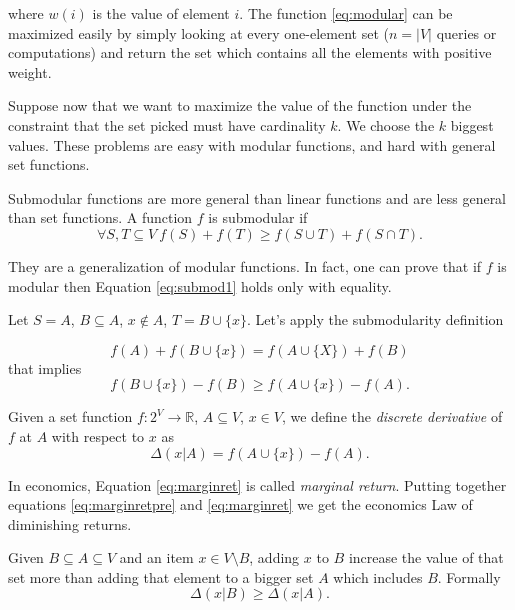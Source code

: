 where $w(i)$ is the value of element $i$. The function \ref{eq:modular} can be maximized easily by simply looking at every one-element set ($n = |V|$ queries or computations) and return the set which contains all the elements with positive weight.

Suppose now that we want to maximize the value of the function under the constraint that the set picked must have cardinality $k$. We choose the $k$ biggest values. These problems are easy with modular functions, and hard with general set functions.

\begin{defn}\label{def:submod1}
	Submodular functions are more general than linear functions and are less general than set functions. A function $f$ is submodular if
	\begin{equation}\label{eq:submod1}
	\forall S, T \subseteq V\ f(S) + f(T) \geq f(S \cup T) + f(S \cap T).
	\end{equation}
\end{defn}

They are a generalization of modular functions. In fact, one can prove that if $f$ is modular then Equation \ref{eq:submod1} holds only with equality.


Let $S = A$, $B \subseteq A$, $x \not\in A$, $T = B \cup \{x\}$. Let's apply the submodularity definition

\begin{equation}
f(A) + f(B \cup \{x\}) = f(A \cup \{X\}) + f(B)
\end{equation}
that implies
\begin{equation}\label{eq:marginretpre}
f(B \cup \{x\}) - f(B) \geq f(A \cup\{x\}) - f(A).
\end{equation}

\begin{defn}
	Given a set function $f:2^V \rightarrow \mathbb{R}$, $A \subseteq V$, $x \in V$, we define the \emph{discrete derivative} of $f$ at $A$ with respect to $x$ as
	\begin{equation}\label{eq:marginret}
	\Delta(x|A) = f(A\cup\{x\}) - f(A).
	\end{equation}
\end{defn}

In economics, Equation \ref{eq:marginret} is called \emph{marginal return}. Putting together equations \ref{eq:marginretpre} and \ref{eq:marginret} we get the economics Law of diminishing returns.

\begin{defn}\label{def:dimret}
	Given $B \subseteq A \subseteq V$ and an item $x \in V \setminus B$, adding $x$ to $B$ increase the value of that set more than adding that element to a bigger set $A$ which includes $B$. Formally
	\begin{equation}
		\Delta(x|B) \geq \Delta(x|A).
	\end{equation} 
\end{defn}

